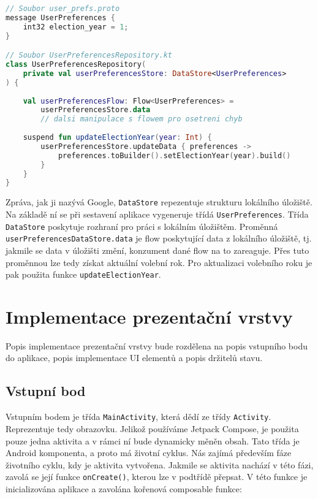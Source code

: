 \begin{lstlisting}[caption={Ukázka práce s Proto DataStore}, label={lst:proto-datastore}, tabsize=2, language=Kotlin]
// Soubor user_prefs.proto
message UserPreferences {
	int32 election_year = 1;
}

// Soubor UserPreferencesRepository.kt
class UserPreferencesRepository(
	private val userPreferencesStore: DataStore<UserPreferences>
) {
	
	val userPreferencesFlow: Flow<UserPreferences> = 
		userPreferencesStore.data
		// dalsi manipulace s flowem pro osetreni chyb
	
	suspend fun updateElectionYear(year: Int) {
		userPreferencesStore.updateData { preferences ->
			preferences.toBuilder().setElectionYear(year).build()
		}
	}
}
\end{lstlisting}

\noindent Zpráva, jak ji nazývá Google, \lstinline|DataStore| repezentuje strukturu lokálního úložiště. Na základě ní se při sestavení aplikace vygeneruje třídá \lstinline|UserPreferences|. Třída \lstinline|DataStore| poskytuje rozhraní pro práci s lokálním úložištěm. Proměnná \lstinline|userPreferencesDataStore.data| je flow poskytující data z lokálního úložiště, tj. jakmile se data v úložišti změní, konzument dané flow na to zareaguje. Přes tuto proměnnou lze tedy získat aktuální volební rok. Pro aktualizaci volebního roku je pak použita funkce \lstinline|updateElectionYear|.

\section {Implementace prezentační vrstvy}
Popis implementace prezentační vrstvy bude rozdělena na popis vstupního bodu do \linebreak aplikace, popis implementace UI elementů a popis držitelů stavu.

\subsection*{Vstupní bod}
Vstupním bodem je třída \lstinline|MainActivity|, která dědí ze třídy \lstinline|Activity|. Reprezentuje tedy obrazovku. Jelikož používáme Jetpack Compose, je použita pouze jedna aktivita a v rámci ní bude dynamicky měněn obsah. Tato třída je Android komponenta, a proto má životní cyklus. Nás zajímá především fáze životního cyklu, kdy je aktivita vytvořena. Jakmile se aktivita nachází v této fázi, zavolá se její funkce \lstinline|onCreate()|, kterou lze v podtřídě přepsat. V této funkce je inicializována aplikace a zavolána kořenová composable funkce:


